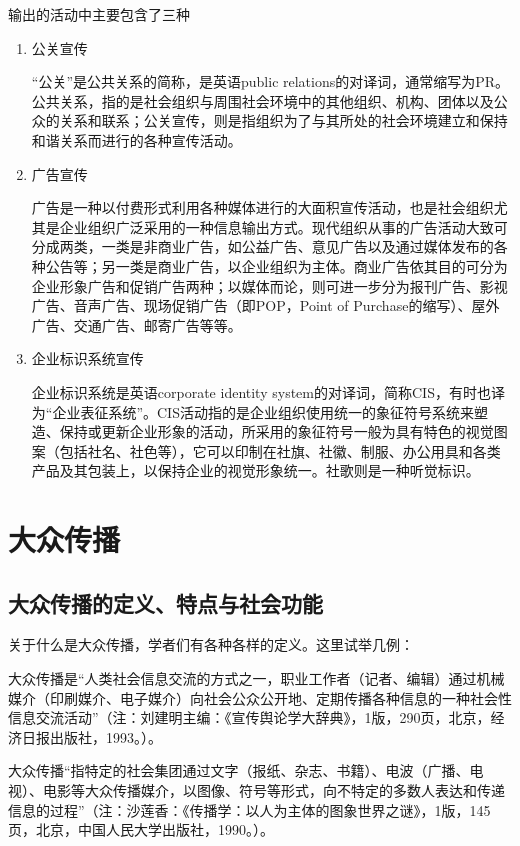 \documentclass[UTF8,12pt]{ctexart}
\numberwithin{equation}{section} %
\numberwithin{figure}{section}
\numberwithin{table}{section}
\begin{document}
	输出的活动中主要包含了三种
	\begin{enumerate}
		\item 公关宣传
		
		“公关”是公共关系的简称，是英语public relations的对译词，通常缩写为PR。公共关系，指的是社会组织与周围社会环境中的其他组织、机构、团体以及公众的关系和联系；公关宣传，则是指组织为了与其所处的社会环境建立和保持和谐关系而进行的各种宣传活动。
		
		\item 广告宣传
		
		广告是一种以付费形式利用各种媒体进行的大面积宣传活动，也是社会组织尤其是企业组织广泛采用的一种信息输出方式。现代组织从事的广告活动大致可分成两类，一类是非商业广告，如公益广告、意见广告以及通过媒体发布的各种公告等；另一类是商业广告，以企业组织为主体。商业广告依其目的可分为企业形象广告和促销广告两种；以媒体而论，则可进一步分为报刊广告、影视广告、音声广告、现场促销广告（即POP，Point of Purchase的缩写）、屋外广告、交通广告、邮寄广告等等。
		
		\item 企业标识系统宣传
		
		企业标识系统是英语corporate identity system的对译词，简称CIS，有时也译为“企业表征系统”。CIS活动指的是企业组织使用统一的象征符号系统来塑造、保持或更新企业形象的活动，所采用的象征符号一般为具有特色的视觉图案（包括社名、社色等），它可以印制在社旗、社徽、制服、办公用具和各类产品及其包装上，以保持企业的视觉形象统一。社歌则是一种听觉标识。
	\end{enumerate}

	\newpage

	\section{大众传播}
	\subsection{大众传播的定义、特点与社会功能}
	关于什么是大众传播，学者们有各种各样的定义。这里试举几例：
	
	大众传播是“人类社会信息交流的方式之一，职业工作者（记者、编辑）通过机械媒介（印刷媒介、电子媒介）向社会公众公开地、定期传播各种信息的一种社会性信息交流活动”（注：刘建明主编：《宣传舆论学大辞典》，1版，290页，北京，经济日报出版社，1993。）。
	
	大众传播“指特定的社会集团通过文字（报纸、杂志、书籍）、电波（广播、电视）、电影等大众传播媒介，以图像、符号等形式，向不特定的多数人表达和传递信息的过程”（注：沙莲香：《传播学：以人为主体的图象世界之谜》，1版，145页，北京，中国人民大学出版社，1990。）。
	
\end{document}
